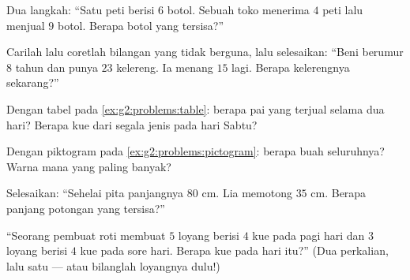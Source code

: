 \begin{exercise}[$\star$]\label{exo:g2:problems:5}
Dua langkah: ``Satu peti berisi $6$ botol. Sebuah toko menerima $4$
peti lalu menjual $9$ botol. Berapa botol yang tersisa?''
\end{exercise}

\begin{exercise}[$\star$]\label{exo:g2:problems:6}
Carilah lalu coretlah bilangan yang tidak berguna, lalu selesaikan:
``Beni berumur $8$ tahun dan punya $23$ kelereng. Ia menang $15$
lagi. Berapa kelerengnya sekarang?''
\end{exercise}

\begin{exercise}[$\star$]\label{exo:g2:problems:7}
Dengan tabel pada \cref{ex:g2:problems:table}: berapa pai yang
terjual selama dua hari? Berapa kue dari segala jenis pada hari Sabtu?
\end{exercise}

\begin{exercise}[$\star$]\label{exo:g2:problems:8}
Dengan piktogram pada \cref{ex:g2:problems:pictogram}: berapa buah
seluruhnya? Warna mana yang paling banyak?
\end{exercise}

\begin{exercise}[$\star$]\label{exo:g2:problems:9}
Selesaikan: ``Sehelai pita panjangnya $80$ cm. Lia memotong $35$ cm.
Berapa panjang potongan yang tersisa?''
\end{exercise}

\begin{exercise}[$\star\star$]\label{exo:g2:problems:10}
``Seorang pembuat roti membuat $5$ loyang berisi $4$ kue pada pagi
hari dan $3$ loyang berisi $4$ kue pada sore hari. Berapa kue pada
hari itu?'' (Dua perkalian, lalu satu  --- atau bilanglah loyangnya dulu!)

\end{exercise}
